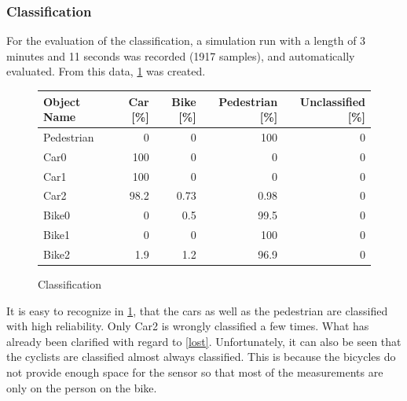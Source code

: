 \documentclass[11pt,oneside,openright]{mpreport}
\begin{document}
\subsubsection{Classification}
For the evaluation of the classification, a simulation run with a length of 3 minutes and 11 seconds was recorded (1917 samples), and automatically evaluated. 
From this data, \cref{classification} was created.

\begin{figure}[!htb]
  \caption{Classification} 
  \centering
  \begin{tabularx}{\textwidth}{X|r|r|r|r}
  \hline \textbf{Object Name} & \textbf{Car [\%]} & \textbf{Bike [\%]} & \textbf{Pedestrian [\%]} & \textbf{Unclassified [\%]} \\\hline
    Pedestrian & 0 & 0 & 100 & 0 \\\hline
    Car0 & 100 & 0 & 0 & 0 \\\hline
    Car1 & 100 & 0 & 0 & 0 \\\hline
    Car2 & 98.2 & 0.73 & 0.98 & 0 \\\hline
    Bike0 & 0 & 0.5 & 99.5 & 0 \\\hline
    Bike1 & 0 & 0 & 100 & 0 \\\hline
    Bike2 & 1.9 & 1.2 & 96.9 & 0 \\
  \end{tabularx}
 \label{classification}
\end{figure}




It is easy to recognize in \cref{classification}, that the cars as well as the pedestrian are classified with high reliability. Only Car2 is wrongly classified a few times.
What has already been clarified with regard to \cref{lost}. Unfortunately, it can also be seen that the cyclists are classified almost always classified. 
This is because the bicycles do not provide enough space for the sensor so that most of the measurements are only on the person on the bike.
\end{document}
